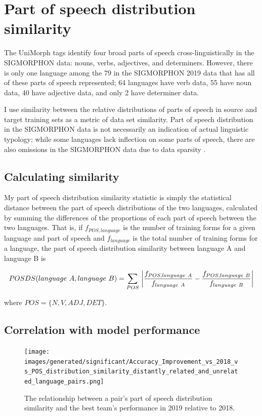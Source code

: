 \newpage

\section{Part of speech distribution similarity}
\label{sec:POSDS}

The UniMorph tags identify four broad parts of speech cross-linguistically in the SIGMORPHON data: nouns, verbs, adjectives, and determiners. However, there is only one language among the 79 in the SIGMORPHON 2019 data that has all of these parts of speech represented; 64 languages have verb data, 55 have noun data, 40 have adjective data, and only 2 have determiner data. 

I use similarity between the relative distributions of parts of speech in source and target training sets as a metric of data set similarity. Part of speech distribution in the SIGMORPHON data is not necessarily an indication of actual linguistic typology; while some languages lack inflection on some parts of speech, there are also omissions in the SIGMORPHON data due to data sparsity \parencite{Cotterell2018b}.

\subsection{Calculating similarity}

My part of speech distribution similarity statistic is simply the statistical distance between the part of speech distributions of the two languages, calculated by summing the differences of the proportions of each part of speech between the two languages. That is, if $f_{POS, language}$ is the number of training forms for a given language and part of speech and $f_{language}$ is the total number of training forms for a language, the part of speech distribution similarity between language A and language B is

\[POSDS(language\ A, language\ B) = \sum\limits_{POS}\ \abs*{\frac{f_{POS, language\ A}}{f_{language\ A}} - \frac{f_{POS, language\ B}}{f_{language\ B}}}\]

where $POS = \{N, V, ADJ, DET\}$.

\subsection{Correlation with model performance}

\begin{figure}[ht]
\texttt{[image: images/generated/significant/Accuracy\_Improvement\_vs\_2018\_vs\_POS\_distribution\_similarity\_distantly\_related\_and\_unrelated\_language\_pairs.png]}
\centering
\caption{The relationship between a pair's part of speech distribution similarity and the best team's performance in 2019 relative to 2018.}
\end{figure}


